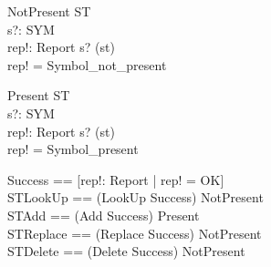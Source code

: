 \begin{schema}{NotPresent}
  \Xi ST \\
  s?: SYM \\
  rep!: Report
\where
  s? \notin \dom(st) \\
  rep! = Symbol\_not\_present
\end{schema}

\begin{schema}{Present}
  \Xi ST \\
  s?: SYM \\
  rep!: Report
\where
  s? \in \dom(st) \\
  rep! = Symbol\_present
\end{schema}

\begin{zed}
Success == [rep!: Report | rep! = OK] \\
STLookUp == (LookUp \land Success) \lor NotPresent \\
STAdd == (Add \land Success) \lor Present \\
STReplace == (Replace \land Success) \lor NotPresent \\
STDelete == (Delete \land Success) \lor NotPresent
\end{zed}
